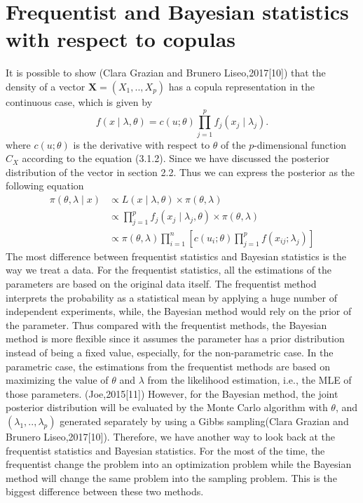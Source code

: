 \documentclass[mstat,12pt]{unswthesis}  %
\numberwithin{equation}{section}
\begin{document}
\section{Frequentist and Bayesian statistics with respect to copulas}
It is possible to show (Clara Grazian and Brunero Liseo,2017[10]) that the density of a vector $\boldsymbol{X} = (X_1,..,X_p)$ has a copula representation in the continuous case, which is given by
\begin{equation}
f(x \mid \lambda, \theta)=c(u ; \theta) \prod_{j=1}^{p} f_{j}\left(x_{j} \mid \lambda_{j}\right).
\end{equation}
where $c(u;\theta)$ is the derivative with respect to $\theta$ of the $p$-dimensional function $C_X$ according to the equation (3.1.2). Since we have discussed the posterior distribution of the vector in section 2.2. Thus we can express the posterior as the following equation
\begin{equation}
\begin{split}
    \pi(\theta, \lambda \mid x) &\propto L(x \mid \lambda, \theta) \times \pi(\theta, \lambda) \\
     &\propto \prod_{j=1}^{p} f_{j}\left(x_{j} \mid \lambda_{j},\theta\right) \times \pi(\theta, \lambda)\\
     &\propto \pi(\theta, \lambda) \prod_{i=1}^{n}\left[c\left(u_{i} ; \theta\right) \prod_{j=1}^{p} f\left(x_{i j} ; \lambda_{j}\right)\right]
\end{split}
\end{equation}
The most difference between frequentist statistics and Bayesian statistics is the way we treat a data. For the frequentist statistics, all the estimations of the parameters are based on the original data itself. The frequentist method interprets the probability as a statistical mean by applying a huge number of independent experiments, while, the Bayesian method would rely on the prior of the parameter. Thus compared with the frequentist methods, the Bayesian method is more flexible since it assumes the parameter has a prior distribution instead of being a fixed value, especially, for the non-parametric case. In the parametric case, the estimations from the frequentist methods are based on maximizing the value of $\theta$ and $\lambda$ from the likelihood estimation, i.e., the MLE of those parameters. (Joe,2015[11]) However, for the Bayesian method, the joint posterior distribution will be evaluated by the Monte Carlo algorithm with $\theta$, and $(\lambda_1,..,\lambda_p)$ generated separately by using a Gibbs sampling(Clara Grazian and Brunero Liseo,2017[10]). Therefore, we have another way to look back at the frequentist statistics and Bayesian statistics. For the most of the time, the frequentist change the problem into an optimization problem while the Bayesian method will change the same problem into the sampling problem. This is the biggest difference between these two methods.
\end{document}
